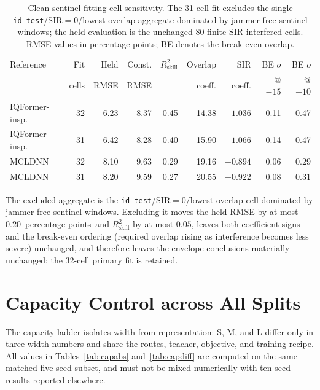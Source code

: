 \documentclass[letterpaper,onecolumn,11pt,journal]{IEEEtran}
\newcommand{\pp}{percentage points}
\begin{document}
\begin{table}[t]
\centering
\caption{Clean-sentinel fitting-cell sensitivity. The 31-cell fit excludes
the single \texttt{id\_test}/SIR$=0$/lowest-overlap aggregate dominated by
jammer-free sentinel windows; the held evaluation is the unchanged 80
finite-SIR interfered cells. RMSE values in \pp; BE denotes the break-even
overlap.}
\label{tab:sentinel}
\scriptsize
\setlength{\tabcolsep}{2.0pt}
\begin{tabular}{lrrrrrrrr}
\toprule
Reference & Fit & Held & Const. & $R^2_{\mathrm{skill}}$ & Overlap & SIR & BE $o$ & BE $o$\\
& cells & RMSE & RMSE & & coeff. & coeff. & @ $-15$ & @ $-10$\\
\midrule
IQFormer-insp. & 32 & 6.23 & 8.37 & 0.45 & 14.38 & $-1.036$ & 0.11 & 0.47\\
IQFormer-insp. & 31 & 6.42 & 8.28 & 0.40 & 15.90 & $-1.066$ & 0.14 & 0.47\\
\midrule
MCLDNN & 32 & 8.10 & 9.63 & 0.29 & 19.16 & $-0.894$ & 0.06 & 0.29\\
MCLDNN & 31 & 8.20 & 9.59 & 0.27 & 20.55 & $-0.922$ & 0.08 & 0.31\\
\bottomrule
\end{tabular}
\end{table}

The excluded aggregate is the \texttt{id\_test}/SIR$=0$/lowest-overlap cell
dominated by jammer-free sentinel windows. Excluding it moves the held RMSE
by at most $0.20$~\pp\ and $R^2_{\mathrm{skill}}$ by at most $0.05$, leaves
both coefficient signs and the break-even ordering (required overlap rising
as interference becomes less severe) unchanged, and therefore leaves the
envelope conclusions materially unchanged; the 32-cell primary fit is
retained.

\section{Capacity Control across All Splits}
The capacity ladder isolates width from representation: S, M, and L differ only
in three width numbers and share the routes, teacher, objective, and training
recipe. All values in Tables~\ref{tab:capabs} and~\ref{tab:capdiff} are
computed on the same matched five-seed subset, and must not be mixed
numerically with ten-seed results reported elsewhere.
\end{document}
